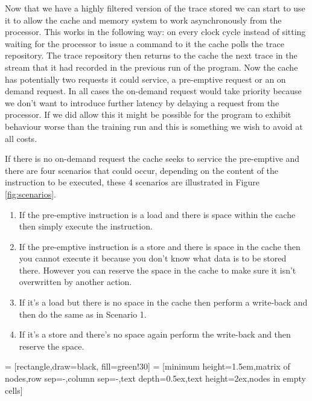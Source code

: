Now that we have a highly filtered version of the trace stored we can start to use it to allow the cache and memory system to work asynchronously from the processor. This works in the following way: on every clock cycle instead of sitting waiting for the processor to issue a command to it the cache polls the trace repository. The trace repository then returns to the cache the next trace in the stream that it had recorded in the previous run of the program. Now the cache has potentially two requests it could service, a pre-emptive request or an on demand request. In all cases the on-demand request would take priority because we don't want to introduce further latency by delaying a request from the processor. If we did allow this it might be possible for the program to exhibit behaviour worse than the training run and this is something we wish to avoid at all costs.

If there is no on-demand request the cache seeks to service the pre-emptive and there are four scenarios that could occur, depending on the content of the instruction to be executed, these 4 scenarios are illustrated in Figure \ref{fig:scenarios}.

\begin{enumerate}[label=\textbf{Scenario \arabic*:}, align=left, leftmargin=*,labelindent=16pt]
	\item If the pre-emptive instruction is a load and there is space within the cache then simply execute the instruction.
	\item If the pre-emptive instruction is a store and there is space in the cache then you cannot execute it because you don't know what data is to be stored there. However you can reserve the space in the cache to make sure it isn't overwritten by another action.
	\item If it's a load but there is no space in the cache then perform a write-back and then do the same as in Scenario 1.
	\item If it's a store and there's no space again perform the write-back and then reserve the space.
\end{enumerate}

 = [rectangle,draw=black, fill=green!30]
 = [minimum height=1.5em,matrix of nodes,row sep=-\pgflinewidth,column sep=-\pgflinewidth,text depth=0.5ex,text height=2ex,nodes in empty cells]

